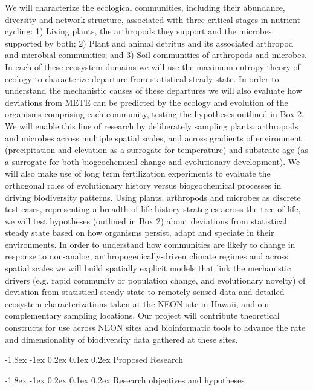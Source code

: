 \documentclass[11pt]{article}
\makeatletter
\renewcommand\section{\@startsection{section}{1}{\z@}%
                                  {-1.8ex \@plus -1ex \@minus 0.2ex}%
                                  {0.1ex \@plus 0.2ex}%
                                  {\normalfont\Large\bfseries}}
\makeatother
\begin{document}
We will characterize the ecological communities, including their
abundance, diversity and network structure, associated with three
critical stages in nutrient cycling: 1) Living plants, the arthropods
they support and the microbes supported by both; 2) Plant and animal
detritus and its associated arthropod and microbial communities; and
3) Soil communities of arthropods and microbes.  In each of these
ecosystem domains we will use the maximum entropy theory of ecology to
characterize departure from statistical steady state.  In order to
understand the mechanistic causes of these departures we will also
evaluate how deviations from METE can be predicted by the ecology and
evolution of the organisms comprising each community, testing the
hypotheses outlined in Box 2.  We will enable this line of research by
deliberately sampling plants, arthropods and microbes across multiple
spatial scales, and across gradients of environment (precipitation and
elevation as a surrogate for temperature) and substrate age (as a
surrogate for both biogeochemical change and evolutionary
development).  We will also make use of long term fertilization
experiments \citep{vitousek} to evaluate the orthogonal roles of
evolutionary history versus biogeochemical processes in driving
biodiversity patterns.  Using plants, arthropods and microbes as
discrete test cases, representing a breadth of life history strategies
across the tree of life, we will test hypotheses (outlined in Box 2)
about deviations from statistical steady state based on how organisms
persist, adapt and speciate in their environments.  In order to
understand how communities are likely to change in response to
non-analog, anthropogenically-driven climate regimes and across
spatial scales we will build spatially explicit models that link the
mechanistic drivers (e.g. rapid community or population change, and
evolutionary novelty) of deviation from statistical steady state to
remotely sensed data and detailed ecosystem characterizations taken at
the NEON site in Hawaii, and our complementary sampling locations. Our
project will contribute theoretical constructs for use across NEON
sites and bioinformatic tools to advance the rate and dimensionality
of biodiversity data gathered at these sites.

\section{Proposed Research}

\section{Research objectives and hypotheses}
\end{document}
